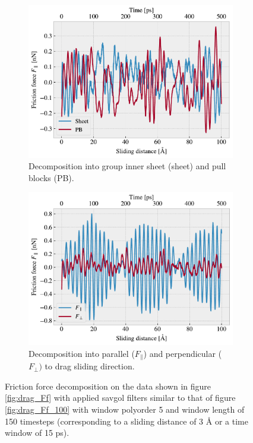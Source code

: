 \begin{figure}[H]
  \centering
  \begin{subfigure}[t]{0.49\textwidth}
    \centering
    \includegraphics[width=\textwidth]{figures/baseline/decomp_group.pdf}
    \caption{Decomposition into group inner sheet (sheet) and pull blocks (PB).}
    \label{fig:decomp_group}
  \end{subfigure}
  \hfill
  \begin{subfigure}[t]{0.49\textwidth}
      \centering
      \includegraphics[width=\textwidth]{figures/baseline/decomp_direc.pdf}
      \caption{Decomposition into parallel ($F_{\parallel}$) and perpendicular ($F_{\perp})$ to drag sliding direction.}
      \label{fig:decomp_direc}
  \end{subfigure}
  \caption{Friction force decomposition on the data shown in figure \ref{fig:drag_Ff} with applied savgol filters similar to that of figure \ref{fig:drag_Ff_100} with window polyorder 5 and window length of 150 timesteps (corresponding to a sliding distance of 3 Å or a time window of 15 ps).}
  \label{fig:decomp}
\end{figure}


